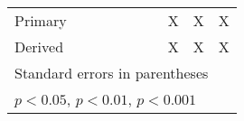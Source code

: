 {\begin{tabular}{l*{9}{c}}
Primary             &                     &                     &                     &                     &                     &                     &           X         &           X         &           X         \\
Derived             &                     &                     &                     &                     &                     &                     &           X         &           X         &           X         \\
\hline\hline
\multicolumn{10}{l}{\footnotesize Standard errors in parentheses}\\
\multicolumn{10}{l}{\footnotesize \sym{*} \(p<0.05\), \sym{**} \(p<0.01\), \sym{***} \(p<0.001\)}\\
\end{tabular}
}
